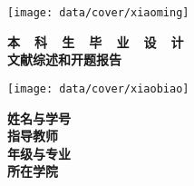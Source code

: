 \thispagestyle{empty}

{
\setlength{\parindent}{0em}
\renewcommand{\baselinestretch}{2}

\vspace*{-7mm}

\begin{center}
  \texttt{[image: data/cover/xiaoming]}
\end{center}

\vspace{-1mm}

{
\renewcommand{\baselinestretch}{1.8}
\heiti\erhao\bfseries
\centering
本~~科~~生~~毕~~业~~设~~计 \\
文献综述和开题报告 \par
}

\vspace{4em}

\begin{center}
  \texttt{[image: data/cover/xiaobiao]}
\end{center}

\vspace{3em}

{
	\renewcommand{\baselinestretch}{1.65}
	\sanhao
	\centering
	{\kaiti\bfseries 姓名与学号} \; \underline{\makebox[13em]{\songti\zjuauthornamec~~\zjuauthorid}} \\ \vspace{0.9em}
	{\kaiti\bfseries 指导教师} \; \underline{\makebox[14em]{\songti\zjumentorc}} \\ \vspace{0.9em}
	{\kaiti\bfseries 年级与专业} \; \underline{\makebox[13em]{\songti\zjugrade~~\zjumajor}} \\ \vspace{0.9em}
	{\kaiti\bfseries 所在学院} \; \underline{\makebox[14em]{\songti\zjucollegec}} \par
}
}


